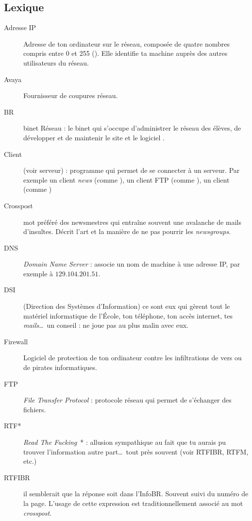 
\subsection{Lexique}

\begin{description}
  \item[Adresse IP] Adresse de ton ordinateur sur le réseau, composée de quatre nombres compris entre 0 et 255  (). Elle identifie ta machine auprès des autres utilisateurs du réseau.
  \item[Avaya] Fournisseur de coupures réseau.
  \item[BR] binet Réseau : le binet qui s'occupe d'administrer le réseau des élèves, de développer et de maintenir le site  et le logiciel .
  \item[Client] (voir serveur) : programme qui permet de se connecter à un serveur. Par exemple un client \emph{news} (comme ), un client FTP (comme ), un client  (comme )
  \item[Crosspost] mot préféré des newsmestres qui entraîne souvent une avalanche de mails d'insultes. Décrit l'art et la manière de ne pas pourrir les \emph{newsgroups}.
  \item[DNS] \emph{Domain Name Server} : associe un nom de machine à une adresse IP, par exemple  à  $129.104.201.51$.
  \item[DSI] (Direction des Systèmes d'Information) ce sont eux qui gèrent tout le matériel informatique de l'\'Ecole, ton téléphone, ton accès internet, tes \emph{mails}\ldots\ un conseil : ne joue pas au plus malin avec eux.
  \item[Firewall] Logiciel de protection de ton ordinateur contre les infiltrations de vers ou de pirates informatiques.
  \item[FTP] \emph{File Transfer Protocol} : protocole réseau qui permet de s'échanger des fichiers.
  \item[RTF*] \emph{Read The Fucking}\ * : allusion sympathique au fait que tu aurais pu trouver l'information autre part\ldots\ tout près souvent (voir RTFIBR, RTFM, etc.)
  \item[RTFIBR] il semblerait que la réponse soit dans l'InfoBR. Souvent suivi du numéro de la page. L'usage de cette expression est traditionnellement associé au mot \emph{crosspost}.

\end{description}

